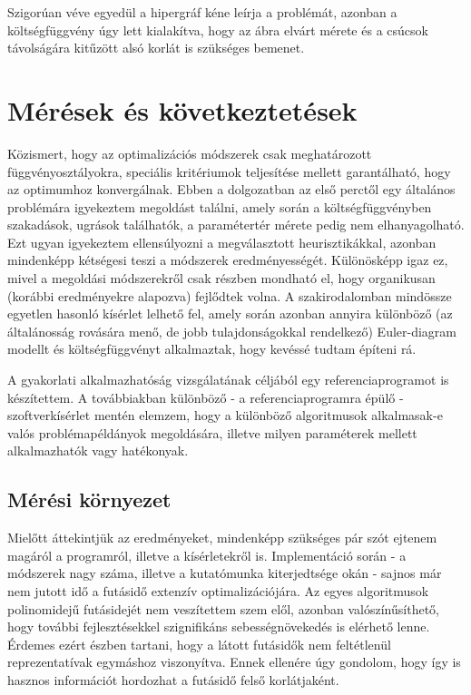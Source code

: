 Szigorúan véve egyedül a hipergráf kéne leírja a problémát, azonban a költségfüggvény úgy lett kialakítva, hogy az ábra elvárt mérete és a csúcsok távolságára kitűzött alsó korlát is szükséges bemenet.



\section{Mérések és következtetések}

Közismert, hogy az optimalizációs módszerek csak meghatározott függvényosztályokra, speciális kritériumok teljesítése mellett garantálható, hogy az optimumhoz konvergálnak. Ebben a dolgozatban az első perctől egy általános problémára igyekeztem megoldást találni, amely során a költségfüggvényben szakadások, ugrások találhatók, a paramétertér mérete pedig nem elhanyagolható. Ezt ugyan igyekeztem ellensúlyozni a megválasztott heurisztikákkal, azonban mindenképp kétségesi teszi a módszerek eredményességét. Különösképp igaz ez, mivel a megoldási módszerekről csak részben mondható el, hogy organikusan (korábbi eredményekre alapozva) fejlődtek volna. A szakirodalomban mindössze egyetlen hasonló kísérlet lelhető fel\cite{layout_metrics}, amely során azonban annyira különböző (az általánosság rovására menő, de jobb tulajdonságokkal rendelkező) Euler-diagram modellt és költségfüggvényt alkalmaztak, hogy kevéssé tudtam építeni rá.


A gyakorlati alkalmazhatóság vizsgálatának céljából egy referenciaprogramot is készítettem. A továbbiakban különböző - a referenciaprogramra épülő - szoftverkísérlet mentén elemzem, hogy a különböző algoritmusok alkalmasak-e valós problémapéldányok megoldására, illetve milyen paraméterek mellett alkalmazhatók vagy hatékonyak.


\subsection{Mérési környezet}

Mielőtt áttekintjük az eredményeket, mindenképp szükséges pár szót ejtenem magáról a programról, illetve a kísérletekről is. Implementáció során - a módszerek nagy száma, illetve a kutatómunka kiterjedtsége okán - sajnos már nem jutott idő a futásidő extenzív optimalizációjára. Az egyes algoritmusok polinomidejű futásidejét nem veszítettem szem elől, azonban valószínűsíthető, hogy további fejlesztésekkel szignifikáns sebességnövekedés is elérhető lenne. Érdemes ezért észben tartani, hogy a látott futásidők nem feltétlenül reprezentatívak egymáshoz viszonyítva. Ennek ellenére úgy gondolom, hogy így is hasznos információt hordozhat a futásidő felső korlátjaként.


